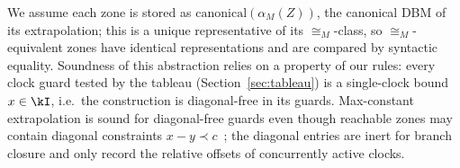 We assume each zone is stored as $\mathrm{canonical}(\alpha_M(Z))$, the canonical DBM of its extrapolation; this is a unique representative of its $\cong_M$-class, so $\cong_M$-equivalent zones have identical representations and are compared by syntactic equality. Soundness of this abstraction relies on a property of our rules: every clock guard {tested} by the tableau (Section~\ref{sec:tableau}) is a single-clock bound $x\in\kI$, i.e.\ the construction is {diagonal-free} in its guards. Max-constant extrapolation is sound for diagonal-free guards even though reachable zones may contain diagonal constraints $x-y\prec c$~\cite{Bouyer05TimedAutomata}; the diagonal entries are inert for branch closure and only record the relative offsets of concurrently active clocks.




